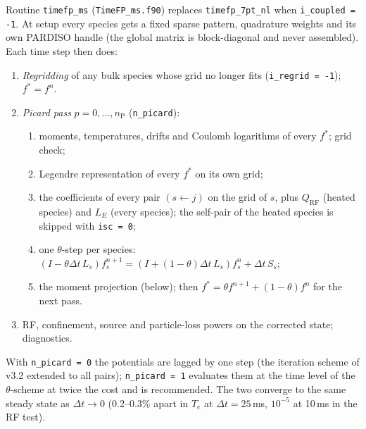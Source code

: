 \documentclass[11pt,a4paper]{article}
\begin{document}
Routine \texttt{timefp\_ms} (\texttt{TimeFP\_ms.f90}) replaces \texttt{timefp\_7pt\_nl} when
\texttt{i\_coupled = -1}.  At setup every species gets a fixed sparse pattern, quadrature weights and
its own PARDISO handle (the global matrix is block-diagonal and never assembled).  Each time step
then does:
\begin{enumerate}
\item \emph{Regridding} of any bulk species whose grid no longer fits (\texttt{i\_regrid = -1});
  $f^*=f^n$.
\item \emph{Picard pass} $p=0,\dots,n_\mathrm P$ (\texttt{n\_picard}):
  \begin{enumerate}
  \item moments, temperatures, drifts and Coulomb logarithms of every $f^*$; grid check;
  \item Legendre representation of every $f^*$ on its own grid;
  \item the coefficients of every pair $(s\leftarrow j)$ on the grid of $s$, plus $Q_\mathrm{RF}$ (heated
    species) and $L_E$ (every species); the self-pair of the heated species is skipped with
    \texttt{isc = 0};
  \item one $\theta$-step per species: $(I-\theta\Delta t\,L_s)f_s^{n+1}=(I+(1-\theta)\Delta t\,L_s)f_s^n
    +\Delta t\,S_s$;
  \item the moment projection (below); then $f^*=\theta f^{n+1}+(1-\theta)f^n$ for the next pass.
  \end{enumerate}
\item RF, confinement, source and particle-loss powers on the corrected state; diagnostics.
\end{enumerate}
With \texttt{n\_picard = 0} the potentials are lagged by one step (the iteration scheme of v3.2
extended to all pairs); \texttt{n\_picard = 1} evaluates them at the time level of the
$\theta$-scheme at twice the cost and is recommended.  The two converge to the same steady state as
$\Delta t\to0$ (0.2--0.3\% apart in $T_e$ at $\Delta t=25$\,ms, $10^{-5}$ at 10\,ms in the RF test).
\end{document}
